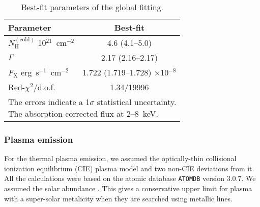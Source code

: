 \documentclass[]{pasj01}
\begin{document}
\begin{table}[ht]
 \caption{Best-fit parameters of the global fitting.}
 \label{t01}
 \begin{center}
  \begin{tabular}{lc}
   \hline
   \hline
   Parameter\footnotemark[$*$]       & Best-fit \\
   \hline
   $N_{\mathrm{H}}^{\mathrm{(cold)}}$ 10$^{21}$~cm$^{-2}$  & 4.6 (4.1--5.0) \\
   $\Gamma$                              & 2.17 (2.16--2.17) \\
   $F_{\mathrm{X}}$ erg~s$^{-1}$~cm$^{-2}$\footnotemark[$\dagger$] & 1.722 (1.719--1.728) $\times$10$^{-8}$ \\
   Red-$\chi^{2}$/d.o.f.             & 1.34/19996 \\
   \hline
   \multicolumn{2}{l}{\parbox{60mm}{
   \footnotesize
   \par \noindent
   \footnotemark[$*$] The errors indicate a 1$\sigma$ statistical uncertainty. \\
   \footnotemark[$\dagger$] The absorption-corrected flux at 2--8~keV.\\
   }}
  \end{tabular}
 \end{center}
\end{table}


\subsubsection{Plasma emission}\label{s3-1-2}
For the thermal plasma emission, we assumed the optically-thin collisional ionization
equilibrium (CIE) plasma model and two non-CIE deviations from it. All the calculations
were based on the atomic database \texttt{ATOMDB} \citep{foster12} version 3.0.7. We
assumed the solar abundance \citep{wilms00}. This gives a conservative upper limit for
plasma with a super-solar metalicity when they are searched using metallic lines.
\end{document}
